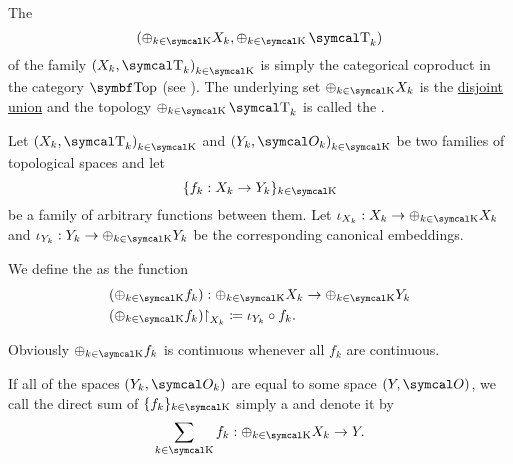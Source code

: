 \begin{Definition}\label{def:topological_sum}\cite[74]{Engelking1989}
  The 
  \begin{equation*}
    (\oplus_{k \in \CK} X_k, \oplus_{k \in \CK} \CT_k)
  \end{equation*}
  of the family \( { (X_k, \CT_k) }_{k \in \CK} \) is simply the categorical coproduct in the category \( \Cat{Top} \) (see ). The underlying set \( \oplus_{k \in \CK} X_k \) is the \hyperref[thm:set_categorical_limits/coproduct]{disjoint union} and the topology \( \oplus_{k \in \CK} \CT_k \) is called the .

  Let \( { (X_k, \CT_k) }_{k \in \CK} \) and \( { (Y_k, \Cal{O}_k) }_{k \in \CK} \) be two families of topological spaces and let 
  \begin{equation*}
    \{ f_k: X_k \to Y_k \}_{k \in \CK}
  \end{equation*}
  be a family of arbitrary functions between them. Let \( \iota_{X_k}: X_k \to \oplus_{k \in \CK} X_k \) and \( \iota_{Y_k}: Y_k \to \oplus_{k \in \CK} Y_k \) be the corresponding canonical embeddings.

  We define the  as the function
  \begin{align*}
    &(\oplus_{k \in \CK} f_k): \oplus_{k \in \CK} X_k \to \oplus_{k \in \CK} Y_k \\
    &(\oplus_{k \in \CK} f_k){\restriction}_{X_k} \coloneqq \iota_{Y_k} \circ f_k.
  \end{align*}

  Obviously \( \oplus_{k \in \CK} f_k \) is continuous whenever all \( f_k \) are continuous.

  If all of the spaces \( (Y_k, \Cal{O}_k) \) are equal to some space \( (Y, \Cal{O}) \), we call the direct sum of \( \{ f_k \}_{k \in \CK} \) simply a  and denote it by
  \begin{equation*}
    \sum_{k \in \CK} f_k: \oplus_{k \in \CK} X_k \to Y.
  \end{equation*}
\end{Definition}
